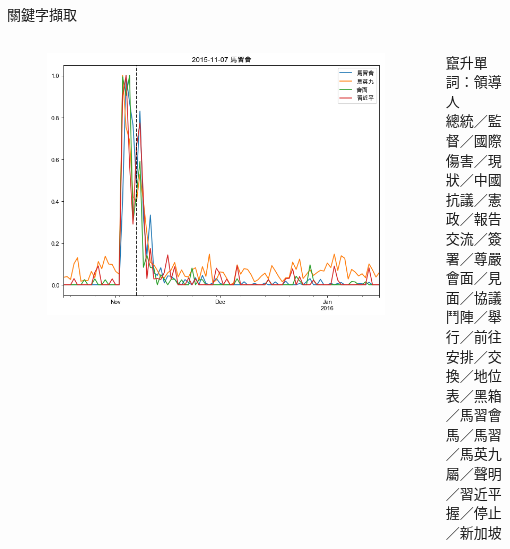 \documentclass{beamer}
\begin{document}
\begin{CJK}{UTF8}{bkai}
\begin{frame}{關鍵字擷取}
\begin{columns}
\begin{column}{.68\textwidth}
  \begin{figure}
    \includegraphics[width=\textwidth, height=\textheight, keepaspectratio]{ts01}
  \end{figure}
\end{column}
\begin{column}{.28\textwidth}
  竄升單詞：領導人\\
  總統／監督／國際\\
  傷害／現狀／中國\\
  抗議／憲政／報告\\
  交流／簽署／尊嚴\\
  會面／見面／協議\\
  鬥陣／舉行／前往\\
  安排／交換／地位\\
  表／黑箱／馬習會\\
  馬／馬習／馬英九\\
  屬／聲明／習近平\\
  握／停止／新加坡\\
\end{column}
\end{columns}
\end{frame}


\end{CJK}
\end{document}
